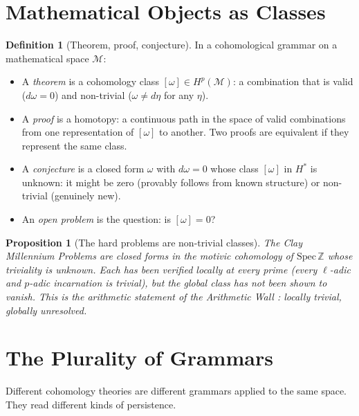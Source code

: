 \documentclass[12pt]{article}
\newtheorem{proposition}[theorem]{Proposition}
\theoremstyle{definition}
\newtheorem{definition}[theorem]{Definition}
\theoremstyle{remark}
\begin{document}
\section{Mathematical Objects as Classes}

\begin{definition}[Theorem, proof, conjecture]
In a cohomological grammar on a mathematical space $\mathcal{M}$:
\begin{itemize}
\item A \emph{theorem} is a cohomology class $[\omega] \in H^p(\mathcal{M})$:
  a combination that is valid ($d\omega = 0$) and non-trivial
  ($\omega \neq d\eta$ for any $\eta$).
\item A \emph{proof} is a homotopy: a continuous path in the space
  of valid combinations from one representation of $[\omega]$ to another.
  Two proofs are equivalent if they represent the same class.
\item A \emph{conjecture} is a closed form $\omega$ with $d\omega = 0$
  whose class $[\omega]$ in $H^*$ is unknown: it might be zero
  (provably follows from known structure) or non-trivial (genuinely new).
\item An \emph{open problem} is the question: is $[\omega] = 0$?
\end{itemize}
\end{definition}

\begin{proposition}[The hard problems are non-trivial classes]
The Clay Millennium Problems \cite{hard} are closed forms in the
motivic cohomology of $\mathrm{Spec}\,\mathbb{Z}$ whose triviality
is unknown.
Each has been verified locally at every prime
(every $\ell$-adic and $p$-adic incarnation is trivial),
but the global class has not been shown to vanish.
This is the arithmetic statement of the Arithmetic Wall \cite{synthesis}:
locally trivial, globally unresolved.
\end{proposition}

\section{The Plurality of Grammars}

Different cohomology theories are different grammars applied to
the same space. They read different kinds of persistence.
\end{document}
